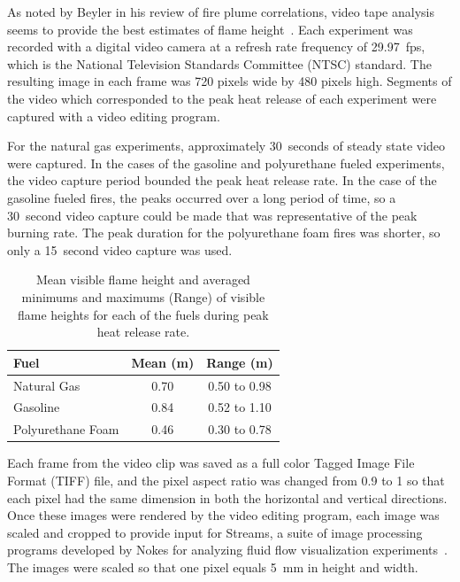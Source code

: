 \documentclass[twoside]{uocthesis}
\begin{document}
{As noted by Beyler in his review of fire plume correlations, video tape analysis seems to provide the best estimates of flame height~\cite{Beyler:1986}. Each experiment was recorded with a digital video camera at a refresh rate frequency of 29.97~fps, which is the National Television Standards Committee (NTSC) standard. The resulting image in each frame was 720 pixels wide by 480 pixels high. Segments of the video which corresponded to the peak heat release of each experiment were captured with a video editing program.

For the natural gas experiments, approximately 30~seconds of steady state video were captured.  In the cases of the gasoline and polyurethane fueled experiments, the video capture period bounded the peak heat release rate.  In the case of the gasoline fueled fires, the peaks occurred over a long period of time, so a 30~second video capture could be made that was representative of the peak burning rate.  The peak duration for the polyurethane foam fires was shorter, so only a 15~second video capture was used.

\begin{table}
  \centering
  \begin{tabular}{|l|c|c|}
     \hline
     Fuel	            & Mean (m)  & Range (m) \\ \hline 
     Natural Gas	    & 0.70	    & 0.50 to 0.98 \\
     Gasoline 	        & 0.84	    & 0.52 to 1.10 \\
     Polyurethane Foam  & 0.46	    & 0.30 to 0.78 \\
     \hline
   \end{tabular}
  \caption[Mean visible flame height and averaged minimums and maximums]{Mean visible flame height and averaged minimums and maximums (Range) of visible flame heights for each of the fuels during peak heat release rate.}
  \label{tab:Flame_Heights}
\end{table}

Each frame from the video clip was saved as a full color Tagged Image File Format (TIFF) file, and the pixel aspect ratio was changed from 0.9 to 1 so that each pixel had the same dimension in both the horizontal and vertical directions.  Once these images were rendered by the video editing program, each image was scaled and cropped to provide input for Streams, a suite of image processing programs developed by Nokes for analyzing fluid flow visualization experiments~\cite{Nokes:2011}. The images were scaled so that one pixel equals 5~mm in height and width.

}
\end{document}
